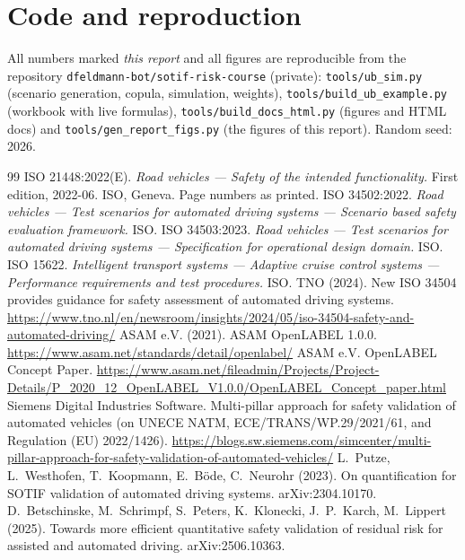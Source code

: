 \documentclass[11pt,a4paper]{article}
\begin{document}
\appendix
\section{Code and reproduction}\label{app:code}
All numbers marked \textit{this report} and all figures are reproducible from the repository \texttt{dfeldmann-bot/sotif-risk-course} (private): \texttt{tools/ub\_sim.py} (scenario generation, copula, simulation, weights), \texttt{tools/build\_ub\_example.py} (workbook with live formulas), \texttt{tools/build\_docs\_html.py} (figures and HTML docs) and \texttt{tools/gen\_report\_figs.py} (the figures of this report). Random seed: 2026.

\begingroup\small
\begin{thebibliography}{99}
 ISO 21448:2022(E). \emph{Road vehicles --- Safety of the intended functionality.} First edition, 2022-06. ISO, Geneva. Page numbers as printed.
 ISO 34502:2022. \emph{Road vehicles --- Test scenarios for automated driving systems --- Scenario based safety evaluation framework.} ISO.
 ISO 34503:2023. \emph{Road vehicles --- Test scenarios for automated driving systems --- Specification for operational design domain.} ISO.
 ISO 15622. \emph{Intelligent transport systems --- Adaptive cruise control systems --- Performance requirements and test procedures.} ISO.
 TNO (2024). New ISO 34504 provides guidance for safety assessment of automated driving systems. \url{https://www.tno.nl/en/newsroom/insights/2024/05/iso-34504-safety-and-automated-driving/}
 ASAM e.V. (2021). ASAM OpenLABEL 1.0.0. \url{https://www.asam.net/standards/detail/openlabel/}
 ASAM e.V. OpenLABEL Concept Paper. \url{https://www.asam.net/fileadmin/Projects/Project-Details/P_2020_12_OpenLABEL_V1.0.0/OpenLABEL_Concept_paper.html}
 Siemens Digital Industries Software. Multi-pillar approach for safety validation of automated vehicles (on UNECE NATM, ECE/TRANS/WP.29/2021/61, and Regulation (EU) 2022/1426). \url{https://blogs.sw.siemens.com/simcenter/multi-pillar-approach-for-safety-validation-of-automated-vehicles/}
 L.~Putze, L.~Westhofen, T.~Koopmann, E.~Böde, C.~Neurohr (2023). On quantification for SOTIF validation of automated driving systems. arXiv:2304.10170.
 D.~Betschinske, M.~Schrimpf, S.~Peters, K.~Klonecki, J.~P.~Karch, M.~Lippert (2025). Towards more efficient quantitative safety validation of residual risk for assisted and automated driving. arXiv:2506.10363.

\end{thebibliography}
\end{document}
